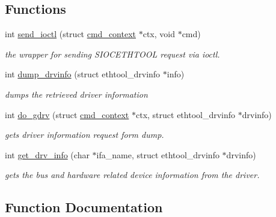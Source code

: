 \subsection*{Functions}
\begin{DoxyCompactItemize}
\item 
int \hyperlink{ethtool-info_8c_a6d58a8ebd8093edbe407365d8f3e93e5}{send\+\_\+ioctl} (struct \hyperlink{structcmd__context}{cmd\+\_\+context} $\ast$ctx, void $\ast$cmd)
\begin{DoxyCompactList}\small\item\em the wrapper for sending S\+I\+O\+C\+E\+T\+H\+T\+O\+OL request via ioctl. \end{DoxyCompactList}\item 
int \hyperlink{ethtool-info_8c_a972c7feb6f25da37144ec7933d787147}{dump\+\_\+drvinfo} (struct ethtool\+\_\+drvinfo $\ast$info)
\begin{DoxyCompactList}\small\item\em dumps the retrieved driver information \end{DoxyCompactList}\item 
int \hyperlink{ethtool-info_8c_a92defcf2493dee90aeaac81e3b15572c}{do\+\_\+gdrv} (struct \hyperlink{structcmd__context}{cmd\+\_\+context} $\ast$ctx, struct ethtool\+\_\+drvinfo $\ast$drvinfo)
\begin{DoxyCompactList}\small\item\em gets driver information request form dump. \end{DoxyCompactList}\item 
int \hyperlink{ethtool-info_8c_af4d8c485fa8cc199f6e1f27e949c9dc4}{get\+\_\+drv\+\_\+info} (char $\ast$ifa\+\_\+name, struct ethtool\+\_\+drvinfo $\ast$drvinfo)
\begin{DoxyCompactList}\small\item\em gets the bus and hardware related device information from the driver. \end{DoxyCompactList}\end{DoxyCompactItemize}


\subsection{Function Documentation}
\mbox{\label{ethtool-info_8c_a92defcf2493dee90aeaac81e3b15572c}} 
